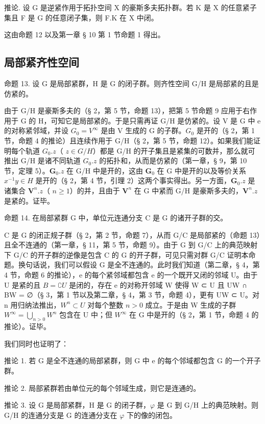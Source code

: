 推论. 设 G 是逆紧作用于拓扑空间 X 的豪斯多夫拓扑群。若 K 是 X 的任意紧子集且 F 是 G 的任意闭子集，则 F.K 在 X 中闭。

这由命题 12 以及第一章 § 10 第 1 节命题 1 得出。

\subsection{局部紧齐性空间}

命题 13. 设 G 是局部紧群，H 是 G 的闭子群。则齐性空间 G/H 是局部紧的且是仿紧的。

由于 G/H 是豪斯多夫的（§ 2，第 5 节，命题 13），把第 5 节命题 9 应用于右作用于 G 的 H，可知它是局部紧的。于是只需再证 G/H 是仿紧的。设 V 是 G 中 e 的对称紧邻域，并设 \(G_{0}=V^{\infty}\) 是由 V 生成的 G 的子群。\(G_{0}\) 是开的（§ 2，第 1 节，命题 4 的推论）且连续作用于 G/H（§ 2，第 5 节，命题 12）。如果我们能证明每个轨道 \(G_{0}.z\)（ \(z\in G/H\)）都是 G/H 的开子集且是紧集的可数并，那么就可推出 G/H 是诸不同轨道 \(G_{0}.z\) 的拓扑和，从而是仿紧的（第一章，§ 9，第 10 节，定理 5）。\(\mathbf{G}_0.z\) 在 G/H 中是开的，这由 \(\mathbf{G}_0\) 在 G 中是开的以及等价关系 \(x^{-1}y\in H\) 是开的（§ 2，第 4 节，引理 2）这两个事实得出。另一方面，\(\mathbf{G}_0.z\) 是诸集合 \(\mathbf{V}^n.z\)（ \(n\geqslant 1\)）的并，且由于 \(\mathbf{V}^n\) 在 G 中紧而 G/H 是豪斯多夫的，\(\mathbf{V}^n.z\) 是紧的。证毕。

命题 14. 在局部紧群 G 中，单位元连通分支 C 是 G 的诸开子群的交。

C 是 G 的闭正规子群（§ 2，第 2 节，命题 7），从而 G/C 是局部紧的（命题 13）且全不连通的（第一章，§ 11，第 5 节，命题 9）。由于 G 到 G/C 上的典范映射下 G/C 的开子群的逆像是包含 C 的 G 的开子群，可见只需对群 G/C 证明本命题。换句话说，我们可以假设 G 是全不连通的。此时我们知道（第二章，§ 4，第 4 节，命题 6 的推论），e 的每个紧邻域都包含 e 的一个既开又闭的邻域 U。由于 U 是紧的且 \(B = \complement U\) 是闭的，存在 e 的对称开邻域 W 使得 W ⊂ U 且 UW ∩ BW = ∅（§ 3，第 1 节以及第二章，§ 4，第 3 节，命题 4），更有 UW ⊂ U。对 n 用归纳法推出，\(W^n \subset U\) 对每个整数 \(n > 0\) 成立。于是由 W 生成的子群 \(W^\infty = \bigcup_{n > 0} W^n\) 包含在 U 中；但 \(W^\infty\) 在 G 中是开的（§ 2，第 1 节，命题 4 的推论）。证毕。

我们同时也证明了：

推论 1. 若 G 是全不连通的局部紧群，则 G 中 e 的每个邻域都包含 G 的一个开子群。

推论 2. 局部紧群若由单位元的每个邻域生成，则它是连通的。

推论 3. 设 G 是局部紧群，H 是 G 的闭子群，\(\varphi\) 是 G 到 G/H 上的典范映射。则 G/H 的连通分支是 G 的连通分支在 \(\varphi\) 下的像的闭包。

